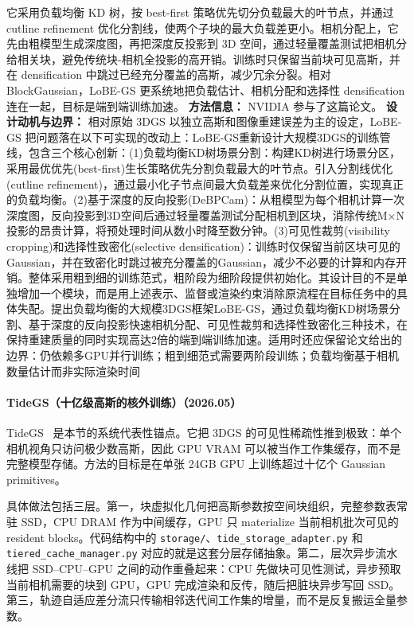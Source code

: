 它采用负载均衡 KD 树，按 best-first 策略优先切分负载最大的叶节点，并通过 cutline refinement 优化分割线，使两个子块的最大负载差更小。相机分配上，它先由粗模型生成深度图，再把深度反投影到 3D 空间，通过轻量覆盖测试把相机分给相关块，避免传统块-相机全投影的高开销。训练时只保留当前块可见高斯，并在 densification 中跳过已经充分覆盖的高斯，减少冗余分裂。相对 BlockGaussian，LoBE-GS 更系统地把负载估计、相机分配和选择性 densification 连在一起，目标是端到端训练加速。
\textbf{方法信息：} NVIDIA 参与了这篇论文。
\textbf{设计动机与边界：} 相对原始 3DGS 以独立高斯和图像重建误差为主的设定，LoBE-GS 把问题落在以下可实现的改动上：LoBE-GS重新设计大规模3DGS的训练管线，包含三个核心创新：(1)负载均衡KD树场景分割：构建KD树进行场景分区，采用最优优先(best-first)生长策略优先分割负载最大的叶节点。引入分割线优化(cutline refinement)，通过最小化子节点间最大负载差来优化分割位置，实现真正的负载均衡。(2)基于深度的反向投影(DeBPCam)：从粗模型为每个相机计算一次深度图，反向投影到3D空间后通过轻量覆盖测试分配相机到区块，消除传统M×N投影的昂贵计算，将预处理时间从数小时降至数分钟。(3)可见性裁剪(visibility cropping)和选择性致密化(selective densification)：训练时仅保留当前区块可见的Gaussian，并在致密化时跳过被充分覆盖的Gaussian，减少不必要的计算和内存开销。整体采用粗到细的训练范式，粗阶段为细阶段提供初始化。其设计目的不是单独增加一个模块，而是用上述表示、监督或渲染约束消除原流程在目标任务中的具体失配。提出负载均衡的大规模3DGS框架LoBE-GS，通过负载均衡KD树场景分割、基于深度的反向投影快速相机分配、可见性裁剪和选择性致密化三种技术，在保持重建质量的同时实现高达2倍的端到端训练加速。适用时还应保留论文给出的边界：仍依赖多GPU并行训练；粗到细范式需要两阶段训练；负载均衡基于相机数量估计而非实际渲染时间
\paragraph{TideGS（十亿级高斯的核外训练）（2026.05）}
TideGS~\cite{2605_20150} 是本节的系统代表性锚点。它把 3DGS 的可见性稀疏性推到极致：单个相机视角只访问极少数高斯，因此 GPU VRAM 可以被当作工作集缓存，而不是完整模型存储。方法的目标是在单张 24GB GPU 上训练超过十亿个 Gaussian primitives。

具体做法包括三层。第一，块虚拟化几何把高斯参数按空间块组织，完整参数表常驻 SSD，CPU DRAM 作为中间缓存，GPU 只 materialize 当前相机批次可见的 resident blocks。代码结构中的 \texttt{storage/}、\texttt{tide\_storage\_adapter.py} 和 \texttt{tiered\_cache\_manager.py} 对应的就是这套分层存储抽象。第二，层次异步流水线把 SSD--CPU--GPU 之间的动作重叠起来：CPU 先做块可见性测试，异步预取当前相机需要的块到 GPU，GPU 完成渲染和反传，随后把脏块异步写回 SSD。第三，轨迹自适应差分流只传输相邻迭代间工作集的增量，而不是反复搬运全量参数。

